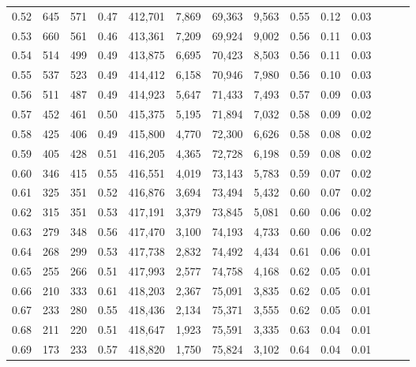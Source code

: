 \begin{tabular}{rrrrrrrrrrrrrr}
0.52 &     645 &    571 &  0.47 &  412,701 &    7,869 &  69,363 &   9,563 &  0.55 &  0.12 &      0.03 \\
0.53 &     660 &    561 &  0.46 &  413,361 &    7,209 &  69,924 &   9,002 &  0.56 &  0.11 &      0.03 \\
0.54 &     514 &    499 &  0.49 &  413,875 &    6,695 &  70,423 &   8,503 &  0.56 &  0.11 &      0.03 \\
0.55 &     537 &    523 &  0.49 &  414,412 &    6,158 &  70,946 &   7,980 &  0.56 &  0.10 &      0.03 \\
0.56 &     511 &    487 &  0.49 &  414,923 &    5,647 &  71,433 &   7,493 &  0.57 &  0.09 &      0.03 \\
0.57 &     452 &    461 &  0.50 &  415,375 &    5,195 &  71,894 &   7,032 &  0.58 &  0.09 &      0.02 \\
0.58 &     425 &    406 &  0.49 &  415,800 &    4,770 &  72,300 &   6,626 &  0.58 &  0.08 &      0.02 \\
0.59 &     405 &    428 &  0.51 &  416,205 &    4,365 &  72,728 &   6,198 &  0.59 &  0.08 &      0.02 \\
0.60 &     346 &    415 &  0.55 &  416,551 &    4,019 &  73,143 &   5,783 &  0.59 &  0.07 &      0.02 \\
0.61 &     325 &    351 &  0.52 &  416,876 &    3,694 &  73,494 &   5,432 &  0.60 &  0.07 &      0.02 \\
0.62 &     315 &    351 &  0.53 &  417,191 &    3,379 &  73,845 &   5,081 &  0.60 &  0.06 &      0.02 \\
0.63 &     279 &    348 &  0.56 &  417,470 &    3,100 &  74,193 &   4,733 &  0.60 &  0.06 &      0.02 \\
0.64 &     268 &    299 &  0.53 &  417,738 &    2,832 &  74,492 &   4,434 &  0.61 &  0.06 &      0.01 \\
0.65 &     255 &    266 &  0.51 &  417,993 &    2,577 &  74,758 &   4,168 &  0.62 &  0.05 &      0.01 \\
0.66 &     210 &    333 &  0.61 &  418,203 &    2,367 &  75,091 &   3,835 &  0.62 &  0.05 &      0.01 \\
0.67 &     233 &    280 &  0.55 &  418,436 &    2,134 &  75,371 &   3,555 &  0.62 &  0.05 &      0.01 \\
0.68 &     211 &    220 &  0.51 &  418,647 &    1,923 &  75,591 &   3,335 &  0.63 &  0.04 &      0.01 \\
0.69 &     173 &    233 &  0.57 &  418,820 &    1,750 &  75,824 &   3,102 &  0.64 &  0.04 &      0.01 \\

\end{tabular}
